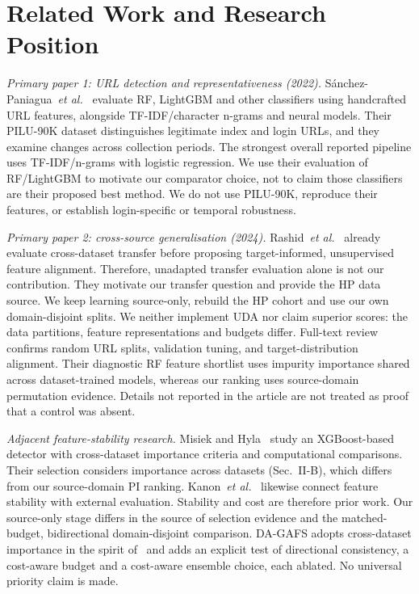 \section{Related Work and Research Position}
\textit{Primary paper 1: URL detection and representativeness (2022).} S\'anchez-Paniagua~\textit{et al.}~\cite{sanchez2022} evaluate RF, LightGBM and other classifiers using handcrafted URL features, alongside TF-IDF/character n-grams and neural models. Their PILU-90K dataset distinguishes legitimate index and login URLs, and they examine changes across collection periods. The strongest overall reported pipeline uses TF-IDF/n-grams with logistic regression. We use their evaluation of RF/LightGBM to motivate our comparator choice, not to claim those classifiers are their proposed best method. We do not use PILU-90K, reproduce their features, or establish login-specific or temporal robustness.

\textit{Primary paper 2: cross-source generalisation (2024).} Rashid~\textit{et al.}~\cite{rashid2024} already evaluate cross-dataset transfer before proposing target-informed, unsupervised feature alignment. Therefore, unadapted transfer evaluation alone is not our contribution. They motivate our transfer question and provide the HP data source. We keep learning source-only, rebuild the HP cohort and use our own domain-disjoint splits. We neither implement UDA nor claim superior scores: the data partitions, feature representations and budgets differ. Full-text review confirms random URL splits, validation tuning, and target-distribution alignment. Their diagnostic RF feature shortlist uses impurity importance shared across dataset-trained models, whereas our ranking uses source-domain permutation evidence. Details not reported in the article are not treated as proof that a control was absent.

\textit{Adjacent feature-stability research.} Misiek and Hyla~\cite{misiek2026} study an XGBoost-based detector with cross-dataset importance criteria and computational comparisons. Their selection considers importance across datasets (Sec.~II-B), which differs from our source-domain PI ranking. Kanon~\textit{et al.}~\cite{kanon2026} likewise connect feature stability with external evaluation. Stability and cost are therefore prior work. Our source-only stage differs in the source of selection evidence and the matched-budget, bidirectional domain-disjoint comparison. DA-GAFS adopts cross-dataset importance in the spirit of~\cite{misiek2026} and adds an explicit test of directional consistency, a cost-aware budget and a cost-aware ensemble choice, each ablated. No universal priority claim is made.

